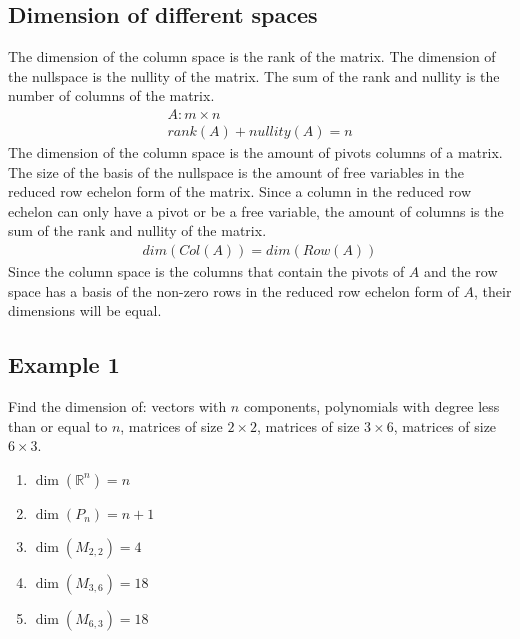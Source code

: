 \documentclass{article}
\theoremstyle{mytheoremstyle}
\theoremstyle{mytheoremstyle}
\theoremstyle{myproblemstyle}
\begin{document}
    \subsection*{Dimension of different spaces}
    The dimension of the column space is the rank of the matrix. The dimension
    of the nullspace is the nullity of the matrix. The sum of the rank and
    nullity is the number of columns of the matrix.
    \begin{align*}
        A: m\times n \\
        rank(A) + nullity(A) = n
    \end{align*}
    The dimension of the column space is the amount of pivots columns of a
    matrix. The size of the basis of the nullspace is the amount of free
    variables in the reduced row echelon form of the matrix. Since a column in
    the reduced row echelon can only have a pivot or be a free variable, the
    amount of columns is the sum of the rank and nullity of the matrix.
    \begin{align*}
        dim(Col(A)) = dim(Row(A))
    \end{align*}
    Since the column space is the columns that contain the pivots of $A$ and the
    row space has a basis of the non-zero rows in the reduced row echelon form
    of $A$, their dimensions will be equal.

    \subsection*{Example 1}
    Find the dimension of: vectors with $n$ components, polynomials with degree
    less than or equal to $n$, matrices of size $2\times 2$, matrices of size
    $3\times 6$, matrices of size $6\times 3$.
    \begin{enumerate}
        \item $\dim(\mathbb{R}^n)= n$
        \item $\dim(P_n)= n+1$
        \item $\dim(M_{2,2})= 4$
        \item $\dim(M_{3,6})= 18$
        \item $\dim(M_{6,3})= 18$
    \end{enumerate}
\end{document}
